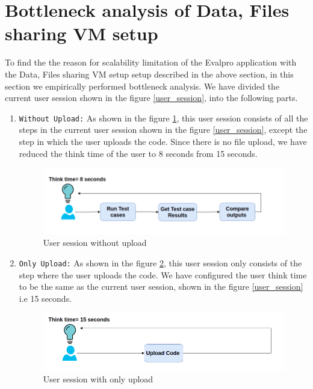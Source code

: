 \documentclass{iitbreport}
\begin{document}
\section{Bottleneck analysis of Data, Files sharing VM setup }
To find the  the reason for scalability limitation  of the Evalpro application with the Data, Files sharing VM setup setup  described in the above section, in this section we empirically performed bottleneck analysis. We have divided the current user session shown in the figure \ref{user_session}, into the following parts.
\begin{enumerate}
    \item {\texttt{Without Upload:}} As shown in the figure \ref{without_upload_session}, this user session consists of all the steps in the current user session shown in the figure  \ref{user_session}, except the step in which the user uploads the code. Since there is no file upload,  we have reduced the think time of the user to 8 seconds from 15 seconds.
    \begin{figure}[!htb]
  \centering
  \includegraphics[width=\linewidth]{Images/with_out_upload_session.png}
  \caption{User session without upload}
  \label{without_upload_session}
\end{figure}
    \item {\texttt{Only Upload:}} As shown in the figure \ref{upload_session}, this user session only consists of the step where the user uploads the code. We have configured the user think time to be the same as the  current user session, shown in the figure \ref{user_session} i.e 15 seconds.
    \begin{figure}[!htb]
  \centering
  \includegraphics[width=\linewidth]{Images/only_upload_session.png}
  \caption{User session with only upload}
  \label{upload_session}
\end{figure}
\end{enumerate}
\end{document}
